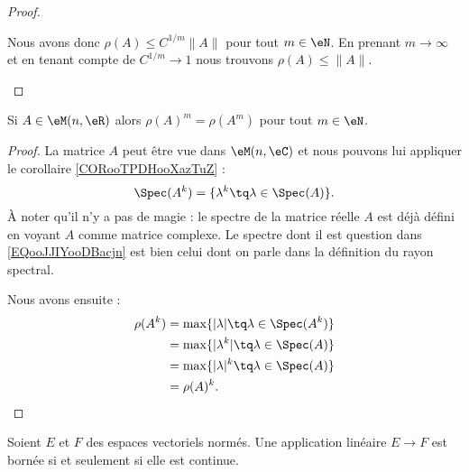 \begin{proof}
\begin{subproof}
            Nous avons donc \( \rho(A)\leq C^{1/m}\| A \|\) pour tout \( m\in\eN\). En prenant \( m\to \infty\) et en tenant compte de \( C^{1/m}\to 1\) nous trouvons \( \rho(A)\leq \| A \|\).
    \end{subproof}
\end{proof}

\begin{proposition}
    Si \( A\in \eM(n,\eR)\) alors \( \rho(A)^m=\rho(A^m)\) pour tout \( m\in \eN\).
\end{proposition}

\begin{proof}
    La matrice \( A\) peut être vue dans \( \eM(n,\eC)\) et nous pouvons lui appliquer le corollaire \ref{CORooTPDHooXazTuZ} :
    \begin{equation}        \label{EQooJJIYooDBacjn}
        \Spec(A^k)=\{ \lambda^k\tq \lambda\in\Spec(A) \}.
    \end{equation}
    À noter qu'il n'y a pas de magie : le spectre de la matrice réelle \( A\) est déjà défini en voyant \( A\) comme matrice complexe. Le spectre dont il est question dans \eqref{EQooJJIYooDBacjn} est bien celui dont on parle dans la définition du rayon spectral.

    Nous avons ensuite :
    \begin{subequations}
        \begin{align}
            \rho(A^k)&=\max\{ | \lambda |\tq \lambda\in\Spec(A^k) \}\\
            &=\max\{ | \lambda^k |\tq \lambda\in\Spec(A) \}\\
            &=\max\{ | \lambda |^k\tq\lambda\in\Spec(A) \}\\
            &=\rho(A)^k.
        \end{align}
    \end{subequations}
\end{proof}

\begin{proposition}       \label{PROPooQZYVooYJVlBd}
    Soient \( E\) et \( F\) des espaces vectoriels normés. Une application linéaire \( E\to F\) est bornée si et seulement si elle est continue.
\end{proposition}


